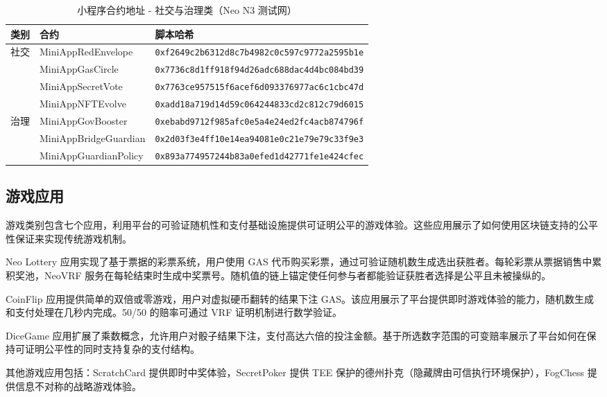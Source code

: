 \documentclass[11pt,a4paper]{article}
\begin{document}
\begin{table}[h]
\centering
\caption{小程序合约地址 - 社交与治理类（Neo N3 测试网）}
\scriptsize
\begin{tabular}{@{}lll@{}}
\toprule
\textbf{类别} & \textbf{合约} & \textbf{脚本哈希} \\
\midrule
\multirow{4}{*}{社交} & MiniAppRedEnvelope & \texttt{0xf2649c2b6312d8c7b4982c0c597c9772a2595b1e} \\
 & MiniAppGasCircle & \texttt{0x7736c8d1ff918f94d26adc688dac4d4bc084bd39} \\
 & MiniAppSecretVote & \texttt{0x7763ce957515f6acef6d093376977ac6c1cbc47d} \\
 & MiniAppNFTEvolve & \texttt{0xadd18a719d14d59c064244833cd2c812c79d6015} \\
\midrule
\multirow{3}{*}{治理} & MiniAppGovBooster & \texttt{0xebabd9712f985afc0e5a4e24ed2fc4acb874796f} \\
 & MiniAppBridgeGuardian & \texttt{0x2d03f3e4ff10e14ea94081e0c21e79e79c33f9e3} \\
 & MiniAppGuardianPolicy & \texttt{0x893a774957244b83a0efed1d42771fe1e424cfec} \\
\bottomrule
\end{tabular}
\label{tab:miniapps-social-gov-addresses}
\end{table}

\subsection{游戏应用}

游戏类别包含七个应用，利用平台的可验证随机性和支付基础设施提供可证明公平的游戏体验。这些应用展示了如何使用区块链支持的公平性保证来实现传统游戏机制。

Neo Lottery 应用实现了基于票据的彩票系统，用户使用 GAS 代币购买彩票，通过可验证随机数生成选出获胜者。每轮彩票从票据销售中累积奖池，NeoVRF 服务在每轮结束时生成中奖票号。随机值的链上锚定使任何参与者都能验证获胜者选择是公平且未被操纵的。

CoinFlip 应用提供简单的双倍或零游戏，用户对虚拟硬币翻转的结果下注 GAS。该应用展示了平台提供即时游戏体验的能力，随机数生成和支付处理在几秒内完成。50/50 的赔率可通过 VRF 证明机制进行数学验证。

DiceGame 应用扩展了乘数概念，允许用户对骰子结果下注，支付高达六倍的投注金额。基于所选数字范围的可变赔率展示了平台如何在保持可证明公平性的同时支持复杂的支付结构。

其他游戏应用包括：ScratchCard 提供即时中奖体验，SecretPoker 提供 TEE 保护的德州扑克（隐藏牌由可信执行环境保护），FogChess 提供信息不对称的战略游戏体验。
\end{document}
